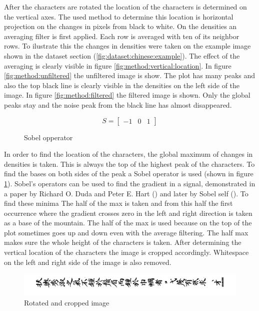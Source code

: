 After the characters are rotated the location of the characters is determined on the vertical axes. The used method to determine this location is horizontal projection on the changes in pixels from black to white. On the densities an averaging filter is first applied. Each row is averaged with ten of its neighbor rows. To ilustrate this the changes in densities were taken on the example image shown in the dataset section (\ref{fig:dataset:chinese:example}). The effect of the averaging is clearly visible in figure \ref{fig:method:vertical:location}. In figure \ref{fig:method:unfiltered} the unfiltered image is show. The plot has many peaks and also the top black line is clearly visible in the densities on the left side of the image. In figure \ref{fig:method:filtered} the filtered image is shown. Only the global peaks stay and the noise peak from the black line has almost disappeared.


\begin{figure}[ht]
  \begin{minipage}{\linewidth}
    \centering
    \[S=\left[\begin{array}{ccc}
		-1 & 0 & 1
    \end{array}\right]\]
  \end{minipage}%
  \caption{Sobel opperator}
  \label{mat:method:sobel}
\end{figure}

In order to find the location of the characters, the global maximum of changes in densities is taken. This is always the top of the highest peak of the characters. To find the bases on both sides of the peak a Sobel operator is used (shown in figure \ref{mat:method:sobel}). Sobel's operators can be used to find the gradient in a signal, demonstrated in a paper by Richard O. Duda and Peter E. Hart (\cite{Duda}) and later by Sobel self (\cite{Sobel}). To find these minima The half of the max is taken and from this half the first occurrence where the gradient crosses zero in the left and right direction is taken as a base of the mountain. The half of the max is used because on the top of the plot sometimes goes up and down even with the average filtering. The half max makes sure the whole height of the characters is taken. After determining the vertical location of the characters the image is cropped accordingly. Whitespace on the left and right side of the image is also removed.

\begin{figure}[ht]
  \centering
  \includegraphics[width=\textwidth]{./images/method/trimmed.png}
  \caption{Rotated and cropped image}
  \label{fig:method:vertical:cropped}
\end{figure}

